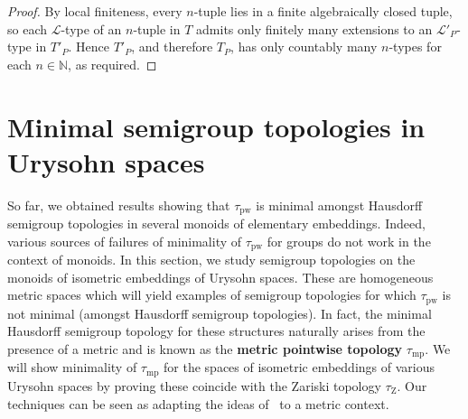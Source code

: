\documentclass{article}
\theoremstyle{remark}
\theoremstyle{definition}
\newcommand{\pw}[0]{\tau_{\mathrm{pw}}}
\newcommand{\zar}[0]{\tau_{\mathrm{Z}}}
\newcommand{\mpw}[0]{\tau_{\mathrm{mp}}}
\begin{document}
{{{{{\begin{proof}
{  By local finiteness,  every $n$-tuple lies in a finite algebraically closed tuple, so each $\mathcal{L}$-type of an $n$-tuple in $T$ admits only finitely many   extensions to an $\mathcal{L}'_P$-type in $T'_P$. Hence $T'_P$, and   therefore $T_P$, has only countably many $n$-types for each   $n \in \mathbb{N}$, as required.}
\end{proof}



\section{ Minimal semigroup topologies in Urysohn spaces }\label{sec:uri}

So far, we obtained results showing that $\pw$ is minimal amongst Hausdorff semigroup topologies in several monoids of elementary embeddings. Indeed, various sources of failures of minimality of $\pw$ for groups do not work in the context of monoids. In this section, we study semigroup topologies on the monoids of isometric embeddings of Urysohn spaces. These are homogeneous metric spaces which will yield examples of semigroup topologies for which $\pw$ is not minimal (amongst Hausdorff semigroup topologies). In fact, the minimal Hausdorff semigroup topology for these structures naturally arises from the presence of a metric and is known as the \textbf{metric pointwise topology} $\mpw$. We will show minimality of $\mpw$ for the spaces of isometric embeddings of various Urysohn spaces by proving these coincide with the Zariski topology $\zar$. Our techniques can be seen as adapting the ideas of~\cite{pinskerschindler} to a metric context.\\


}}}}}
\end{document}
